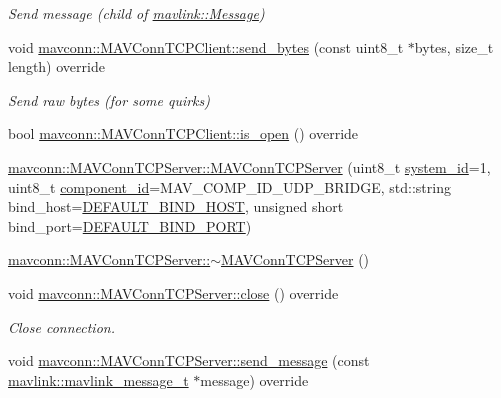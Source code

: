 \begin{DoxyCompactItemize}
\begin{DoxyCompactList}\small\item\em Send message (child of \mbox{\hyperlink{structmavlink_1_1Message}{mavlink\+::\+Message}}) \end{DoxyCompactList}\item 
void \mbox{\hyperlink{group__mavconn_gac327ab4a27b6de2da3c594d93c599312}{mavconn\+::\+M\+A\+V\+Conn\+T\+C\+P\+Client\+::send\+\_\+bytes}} (const uint8\+\_\+t $\ast$bytes, size\+\_\+t length) override
\begin{DoxyCompactList}\small\item\em Send raw bytes (for some quirks) \end{DoxyCompactList}\item 
bool \mbox{\hyperlink{group__mavconn_gadcabe763ecf8fc00e123fcf78af9eaf4}{mavconn\+::\+M\+A\+V\+Conn\+T\+C\+P\+Client\+::is\+\_\+open}} () override
\item 
\mbox{\hyperlink{group__mavconn_gad395465c3a85e4441cbccc84615cacb5}{mavconn\+::\+M\+A\+V\+Conn\+T\+C\+P\+Server\+::\+M\+A\+V\+Conn\+T\+C\+P\+Server}} (uint8\+\_\+t \mbox{\hyperlink{setHome_8cpp_a83150acb88d810ae6864b4c125324ed6}{system\+\_\+id}}=1, uint8\+\_\+t \mbox{\hyperlink{setHome_8cpp_adc84285d5da2c4fa9721d0a32d5e41a7}{component\+\_\+id}}=M\+A\+V\+\_\+\+C\+O\+M\+P\+\_\+\+I\+D\+\_\+\+U\+D\+P\+\_\+\+B\+R\+I\+D\+GE, std\+::string bind\+\_\+host=\mbox{\hyperlink{group__mavconn_gae043843ee4b947094ca58342c442c3b6}{D\+E\+F\+A\+U\+L\+T\+\_\+\+B\+I\+N\+D\+\_\+\+H\+O\+ST}}, unsigned short bind\+\_\+port=\mbox{\hyperlink{group__mavconn_gacf9d47d0f198105f4a27c9668ba793b1}{D\+E\+F\+A\+U\+L\+T\+\_\+\+B\+I\+N\+D\+\_\+\+P\+O\+RT}})
\item 
\mbox{\hyperlink{group__mavconn_gaee25f07913d08d976e205be3136d813c}{mavconn\+::\+M\+A\+V\+Conn\+T\+C\+P\+Server\+::$\sim$\+M\+A\+V\+Conn\+T\+C\+P\+Server}} ()
\item 
void \mbox{\hyperlink{group__mavconn_ga11e23cc16d8a8637583fbecc7bbe915b}{mavconn\+::\+M\+A\+V\+Conn\+T\+C\+P\+Server\+::close}} () override
\begin{DoxyCompactList}\small\item\em Close connection. \end{DoxyCompactList}\item 
void \mbox{\hyperlink{group__mavconn_gacbae4efba2ed887e4a731ca60dceb0a6}{mavconn\+::\+M\+A\+V\+Conn\+T\+C\+P\+Server\+::send\+\_\+message}} (const \mbox{\hyperlink{include__v0_89_2mavlink__types_8h_a63b963764c09dc72f4910c1521e325b9}{mavlink\+::mavlink\+\_\+message\+\_\+t}} $\ast$message) override

\end{DoxyCompactItemize}
